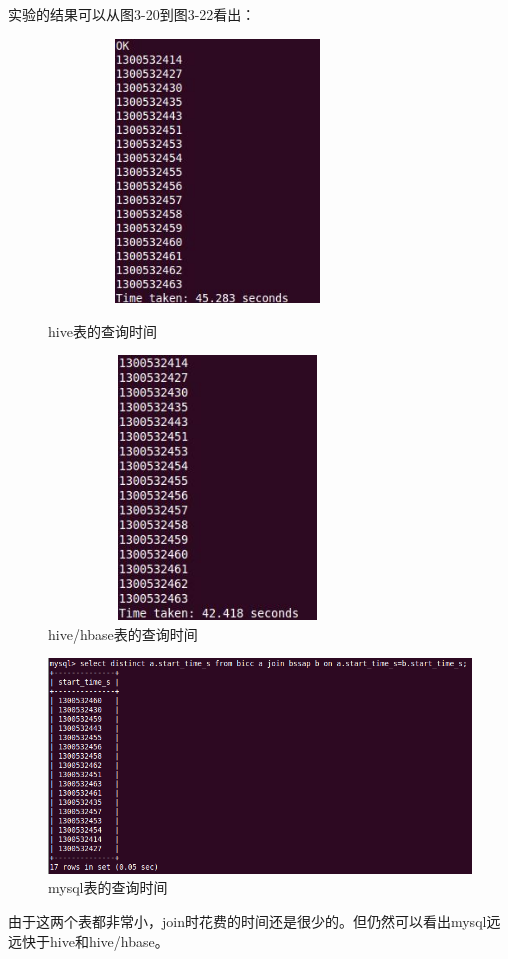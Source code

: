实验的结果可以从图3-20到图3-22看出：
\begin{description}

\item
\begin{figure}[h]
\begin{minipage}[t]{0.45\linewidth}
\centering
\includegraphics[width=0.8\textwidth,height=7cm]{photo/xfh1.png} 
\caption{hive表的查询时间}
\end{minipage}
\hfill
\begin{minipage}[t]{0.45\linewidth}
\centering
\includegraphics[width=0.8\textwidth,height=7cm]{photo/xfh2.png} 
\caption{hive/hbase表的查询时间}
\end{minipage}
\end{figure}

\item
\begin{figure}[!ht]
\centering
\includegraphics[width=0.8\linewidth]{photo/xfm1.png} 
\caption{mysql表的查询时间}
\end{figure} 

\end{description}
由于这两个表都非常小，join时花费的时间还是很少的。但仍然可以看出mysql远远快于hive和hive/hbase。

